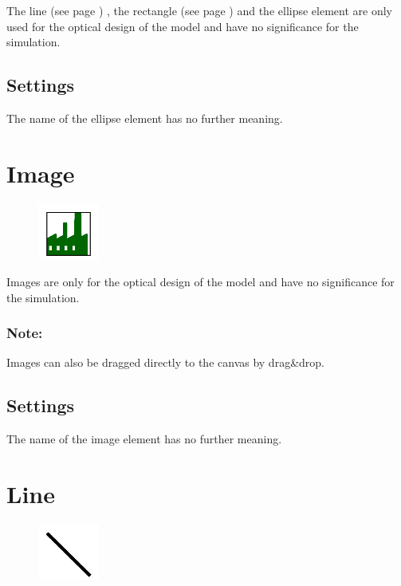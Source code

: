 The line (see page \pageref{ref:ModelElementLine}) , the rectangle (see page \pageref{ref:ModelElementRectangle}) 
and the ellipse element are only used for the optical design of the model and have no significance for the simulation.

\subsection*{Settings}

The name of the ellipse element has no further meaning.


\section{Image}
\label{ref:ModelElementImage}

\begin{figure}
\vspace{-22pt}
\includegraphics[width=2cm]{imageModelElementImage.png}
\vspace{-22pt}
\end{figure}

Images are only for the optical design of the model and have no significance for the simulation.

\subsubsection*{Note:}

Images can also be dragged directly to the canvas by drag\&drop.

\subsection*{Settings}

The name of the image element has no further meaning.


\section{Line}
\label{ref:ModelElementLine}

\begin{figure}
\vspace{-22pt}
\includegraphics[width=2cm]{imageModelElementLine.png}
\vspace{-22pt}
\end{figure}

